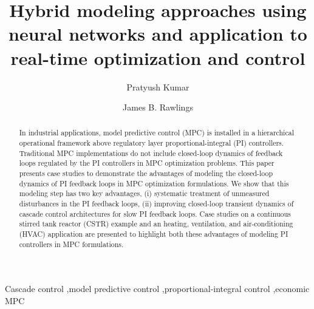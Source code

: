 \documentclass[preprint,5p, twocolumn, authoryear]{elsarticle}
\begin{document}
\begin{frontmatter}


\title{Hybrid modeling approaches using neural networks and
application to real-time optimization and control}

\author[label1]{Pratyush Kumar}

\author[label1]{James B. Rawlings}

\address[label1]{Department of Chemical Engineering, University of California,
        Santa Barbara, CA 93106, United States} 
                
\begin{abstract}

In industrial applications, model predictive control (MPC) is installed in a
hierarchical operational framework above regulatory layer proportional-integral
(PI) controllers. Traditional MPC implementations do not include closed-loop
dynamics of feedback loops regulated by the PI controllers in MPC optimization
problems. This paper presents case studies to demonstrate the advantages of
modeling the closed-loop dynamics of PI feedback loops in MPC optimization
formulations. We show that this modeling step has two key advantages, (i)
systematic treatment of unmeasured disturbances in the PI feedback loops, (ii)
improving closed-loop transient dynamics of cascade control architectures for
slow PI feedback loops. Case studies on a continuous stirred tank reactor (CSTR)
example and an heating, ventilation, and air-conditioning (HVAC) application are
presented to highlight both these advantages of modeling PI controllers in MPC
formulations. 

\end{abstract}

\begin{keyword}
Cascade control \sep model predictive control \sep proportional-integral control
\sep economic MPC
\end{keyword}

\end{frontmatter}
\end{document}
